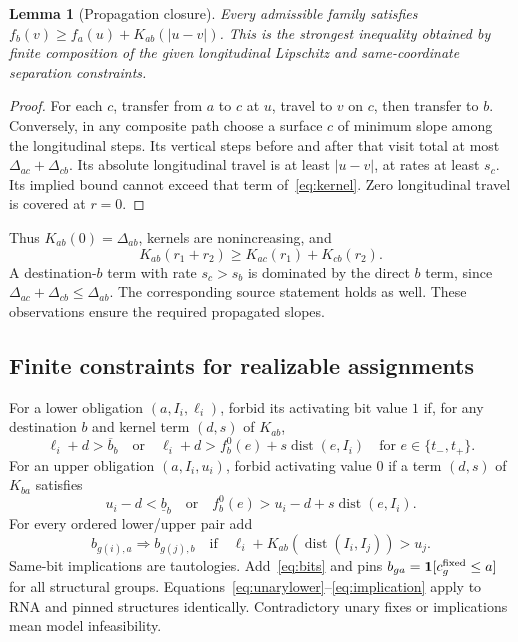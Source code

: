 \documentclass[10pt,letterpaper]{article}
\newtheorem{lemma}[theorem]{Lemma}
\newcommand{\dist}{\operatorname{dist}}
\newcommand{\ind}{\mathbf 1}
\begin{document}
\begin{lemma}[Propagation closure]\label{lem:kernel}
Every admissible family satisfies $f_b(v)\ge f_a(u)+K_{ab}(|u-v|)$. This is the strongest inequality obtained by finite composition of the given longitudinal Lipschitz and same-coordinate separation constraints.
\end{lemma}
\begin{proof}
For each $c$, transfer from $a$ to $c$ at $u$, travel to $v$ on $c$, then transfer to $b$. Conversely, in any composite path choose a surface $c$ of minimum slope among the longitudinal steps. Its vertical steps before and after that visit total at most $\Delta_{ac}+\Delta_{cb}$. Its absolute longitudinal travel is at least $|u-v|$, at rates at least $s_c$. Its implied bound cannot exceed that term of~\eqref{eq:kernel}. Zero longitudinal travel is covered at $r=0$.
\end{proof}
Thus $K_{ab}(0)=\Delta_{ab}$, kernels are nonincreasing, and
\begin{equation}
 K_{ab}(r_1+r_2)\ge K_{ac}(r_1)+K_{cb}(r_2).\label{eq:composition}
\end{equation}
A destination-$b$ term with rate $s_c>s_b$ is dominated by the direct $b$ term, since $\Delta_{ac}+\Delta_{cb}\le\Delta_{ab}$. The corresponding source statement holds as well. These observations ensure the required propagated slopes.



\subsection{Finite constraints for realizable assignments}
For a lower obligation $(a,I_i,\ell_i)$, forbid its activating bit value $1$ if, for any destination $b$ and kernel term $(d,s)$ of $K_{ab}$,
\begin{equation}
 \ell_i+d>\overline b_b\quad\text{or}\quad
 \ell_i+d>f_b^0(e)+s\dist(e,I_i)\quad\text{for }e\in\{t_-,t_+\}.\label{eq:unarylower}
\end{equation}
For an upper obligation $(a,I_i,u_i)$, forbid activating value $0$ if a term $(d,s)$ of $K_{ba}$ satisfies
\begin{equation}
 u_i-d<\underline b_b\quad\text{or}\quad
 f_b^0(e)>u_i-d+s\dist(e,I_i).\label{eq:unaryupper}
\end{equation}
For every ordered lower/upper pair add
\begin{equation}
 b_{g(i),a}\Longrightarrow b_{g(j),b}
 \quad\text{if}\quad \ell_i+K_{ab}(\dist(I_i,I_j))>u_j.\label{eq:implication}
\end{equation}
Same-bit implications are tautologies. Add~\eqref{eq:bits} and pins $b_{ga}=\ind[c_g^{\rm fixed}\le a]$ for all structural groups. Equations~\eqref{eq:unarylower}--\eqref{eq:implication} apply to RNA and pinned structures identically. Contradictory unary fixes or implications mean model infeasibility.
\end{document}

